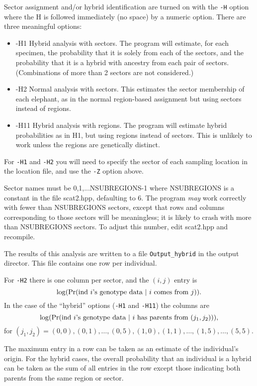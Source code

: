 \documentclass[10pt,titlepage,times,letterpaper]{article}
\def \Pr{{\rm Pr}}
\begin{document}
Sector assignment and/or hybrid identification are
turned on with the {\tt -H} option where the H is
followed immediately (no space) by a numeric option.  There are three
meaningful options:

\begin{itemize}
\item -H1 Hybrid analysis with sectors.  The program will estimate,
for each specimen, the probability that it is solely from each of the
sectors, and the probability that it is a hybrid with ancestry from
each pair of sectors.  (Combinations of more than 2 sectors are
not considered.)
\item -H2  Normal analysis with sectors.   This estimates the
sector membership of each elephant, as in the normal region-based
assignment but using sectors instead of regions.  
\item -H11 Hybrid analysis with regions.  The program will estimate 
hybrid probabilities as in H1, but using regions instead of sectors.  
This is unlikely to work unless the regions are genetically distinct.
\end{itemize}

For {\tt -H1} and {\tt -H2} you will need to specify the sector of
each sampling location in the location file, and use the {\tt -Z} option above. 

Sector names must be 0,1,...NSUBREGIONS-1 where NSUBREGIONS is a
constant in the file scat2.hpp, defaulting to 6.  The program {\it may}
work correctly with fewer than NSUBREGIONS sectors, except that 
rows and columns corresponding to those sectors will be meaningless; it
is likely to crash with more than NSUBREGIONS sectors.  To adjust this
number, edit scat2.hpp and recompile.

The results of this analysis are written to a file {\tt Output\_hybrid} in
the output director.  This file contains one row per individual.

For {\tt -H2} there is one column per sector, and the $(i,j)$ entry
is $$\log(\Pr(\text{ind $i$'s genotype data $\mid$ $i$ comes from $j$})).$$
In the case of the ``hybrid'' options ({\tt -H1} and {\tt -H11}) the columns are
$$\log(\Pr(\text{ind $i$'s genotype data $\mid$ $i$ has parents from $(j_1,j_2)$})),$$
for $(j_1,j_2) = (0,0), (0,1),\dots,(0,5),(1,0),(1,1),\dots,(1,5),\dots, (5,5)$.

The maximum entry in a row can be taken as an estimate of the individual's
origin.  For the hybrid cases, the overall probability that an individual is
a hybrid can be taken as the sum of all entries in the row except those indicating
both parents from the same region or sector.
\end{document}
